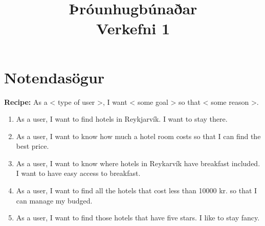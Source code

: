 \documentclass[]{article}
\begin{document}
\title{Þróunhugbúnaðar \\ Verkefni 1}
\maketitle

\section*{Notendasögur}
\textbf{Recipe:}
As a < type of user >, I want < some goal > so that < some reason >.\\


\begin{enumerate}
	\item As a user, I want to find hotels in Reykjarvík. I want to stay there.
	\item As a user, I want to know how much a hotel room costs so that I can find the best price.
	\item As a user, I want to know where hotels in Reykarvík have breakfast included. I want to have easy access to breakfast.
	\item As a user, I want to find all the hotels that cost less than 10000 kr. so that I can manage my budged.
	\item As a user, I want to find those hotels that have five stars. I like to stay fancy.
\end{enumerate}

 
\end{document}

